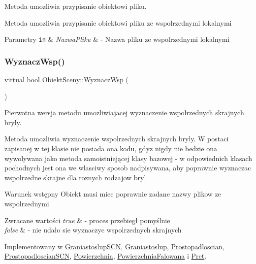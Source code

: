 Metoda umozliwia przypisanie obiektowi pliku. 

Metoda umozliwia przypisanie obiektowi pliku ze wspolrzednymi lokalnymi


\begin{DoxyParams}[1]{Parametry}
\mbox{\tt in}  & {\em Nazwa\+Pliku} & -\/ Nazwa pliku ze wspolrzednymi lokalnymi \\
\hline
\end{DoxyParams}
\mbox{\label{classObiektSceny_a24dd0332c0755d7155128639a9a3e2b4}} 
\subsubsection{\texorpdfstring{Wyznacz\+Wsp()}{WyznaczWsp()}}
{\footnotesize\ttfamily virtual bool Obiekt\+Sceny\+::\+Wyznacz\+Wsp (\begin{DoxyParamCaption}{ }\end{DoxyParamCaption})\hspace{0.3cm}{\ttfamily [pure virtual]}}



Pierwotna wersja metodu umozliwiajacej wyznaczenie wspolrzednych skrajnych bryly. 

Metoda umozliwia wyznaczenie wspolrzednych skrajnych bryly. W postaci zapisanej w tej klasie nie posiada ona kodu, gdyz nigdy nie bedzie ona wywolywana jako metoda samoistniejącej klasy bazowej -\/ w odpowiednich klasach pochodnych jest ona we wlasciwy sposob nadpisywana, aby poprawnie wyznaczac wspolrzedne skrajne dla roznych rodzajow bryl

\begin{DoxyPrecond}{Warunek wstępny}
Obiekt musi miec poprawnie zadane nazwy plikow ze wspolrzednymi 
\end{DoxyPrecond}

\begin{DoxyRetVals}{Zwracane wartości}
{\em true} & -\/ proces przebiegł pomyślnie \\
\hline
{\em false} & -\/ nie udało sie wyznaczyc wspolrzednych skrajnych \\
\hline
\end{DoxyRetVals}


Implementowany w \hyperlink{classGraniastoslupSCN_a096492db05264adae9306f5fb50cc3c9}{Graniastoslup\+S\+CN}, \hyperlink{classGraniastoslup_a786313962b174b9c25084e45e827f39b}{Graniastoslup}, \hyperlink{classProstopadloscian_a9d182fd3d875a1e3928c8972727be6fe}{Prostopadloscian}, \hyperlink{classProstopadloscianSCN_acdd4a5c10fb6347ad65b1a516ee83b01}{Prostopadloscian\+S\+CN}, \hyperlink{classPowierzchnia_a8e2453f9f7e8f92d77bd5608ef3de005}{Powierzchnia}, \hyperlink{classPowierzchniaFalowana_ae9f43f9acfb3db49fc9931ca4917e049}{Powierzchnia\+Falowana} i \hyperlink{classPret_affe3fdc72a84022eb5bbfddbf24cc2fc}{Pret}.



